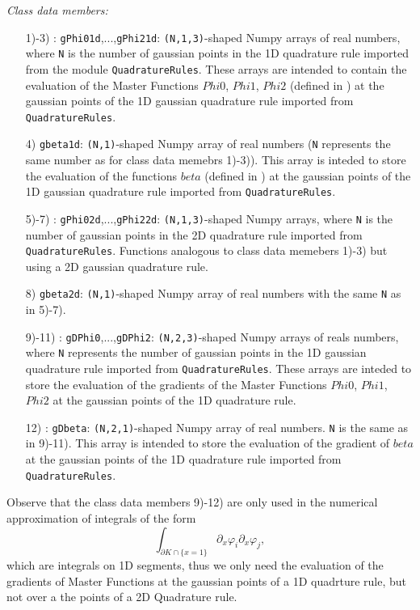 \documentclass{amsart}
\theoremstyle{plain}
\theoremstyle{definition}
\theoremstyle{remark}
\numberwithin{equation}{section}
\begin{document}
\textit{Class data members:}
\begin{itemize}
\item[1)-3)]: \verb|gPhi01d|,...,\verb|gPhi21d|: \verb|(N,1,3)|-shaped Numpy arrays of real numbers, where \verb|N| is the number of gaussian points in the 1D quadrature rule imported from the module \verb|QuadratureRules|. These arrays are intended to contain the evaluation of the Master Functions $Phi0$, $Phi1$, $Phi2$ (defined in \cite{Meyer}) at the gaussian points of the 1D gaussian quadrature rule imported from \verb|QuadratureRules|.
\item[4)] \verb|gbeta1d|: \verb|(N,1)|-shaped Numpy array of real numbers (\verb|N| represents the same number as for class data memebrs 1)-3)).  This array is inteded to store the evaluation of the functions $beta$ (defined in \cite{Meyer}) at the gaussian points of the 1D gaussian quadrature rule imported from \verb|QuadratureRules|. 

\item[5)-7)]: \verb|gPhi02d|,...,\verb|gPhi22d|: \verb|(N,1,3)|-shaped Numpy arrays, where \verb|N| is
the number of gaussian points in the 2D quadrature rule imported from \verb|QuadratureRules|. Functions analogous to class data memebers 1)-3) but using a 2D gaussian quadrature rule.
\item[8)] \verb|gbeta2d|: \verb|(N,1)|-shaped Numpy array of real numbers with the same \verb|N| as in 5)-7).

\item[9)-11)]: \verb|gDPhi0|,...,\verb|gDPhi2|: \verb|(N,2,3)|-shaped Numpy arrays of reals numbers, where \verb|N| represents the number of gaussian points in the 1D gaussian quadrature rule imported from \verb|QuadratureRules|. These arrays are inteded to store the evaluation of the gradients of the Master Functions $Phi0$, $Phi1$, $Phi2$ at the gaussian points of the 1D quadrature rule.

\item[12)]: \verb|gDbeta|: \verb|(N,2,1)|-shaped Numpy array of real numbers. \verb|N| is the same as in 9)-11). This array is intended to store the evaluation of the gradient of $beta$ at the gaussian points of the 1D quadrature rule imported from \verb|QuadratureRules|. 
\end{itemize}
Observe that the class data members 9)-12) are only used in the numerical approximation of  integrals of the form 
$$\int_{\partial K\cap\{x=1\}} \partial_x\varphi_i \partial_x\varphi_j,$$
which are integrals on 1D segments, thus we only need the evaluation of the gradients of Master Functions at the gaussian points of a 1D quadrture rule, but not over a the points of a 2D Quadrature rule.
\end{document}
